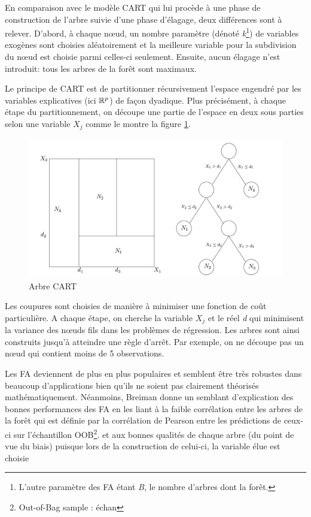 	\par
	 En comparaison avec le modèle CART qui lui procède à une phase de construction de l'arbre suivie d'une phase d'élagage, deux différences sont à relever. D'abord, à chaque nœud, un nombre paramètre (dénoté \textit{k}\footnote{L'autre paramètre des FA étant \textit{B}, le nombre d'arbres dont la forêt.}) de variables exogènes sont choisies aléatoirement et la meilleure variable pour la subdivision du nœud est choisie parmi celles-ci seulement. Ensuite, aucun élagage n'est introduit: tous les arbres de la forêt sont maximaux.\par
	Le principe de CART est de partitionner récursivement l’espace engendré par les variables explicatives (ici $\mathbb{R}^p$) de façon dyadique. Plus précisément, à
	chaque étape du partitionnement, on découpe une partie de l’espace en deux sous parties selon une variable $X_j$ comme le montre la figure \ref{fig:CART}.
	\begin{figure}[h]
	    		\centering
	    		\includegraphics[scale=0.35]{Cart}
	    		\caption{Arbre CART}
	    		\label{fig:CART}
	\end{figure}
	\par
	Les coupures sont choisies de manière à minimiser une fonction de coût particulière. A chaque étape, on cherche la variable $X_j$ et le réel \textit{d} qui minimisent la variance des nœuds fils dans les problèmes de régression. Les arbres sont ainsi construits jusqu’à atteindre une règle d’arrêt. Par exemple, on ne découpe pas un nœud qui contient moins de 5 observations.
	
	
	
	
	
	
	\par
	Les FA deviennent de plus en plus populaires et semblent être très robustes dans beaucoup d'applications bien qu'ils ne soient pas clairement théorisés mathématiquement\cite{BIA08}. Néanmoins, Breiman\cite{BREI01} donne un semblant d'explication des bonnes performances des FA en les liant à la faible corrélation entre les arbres de la forêt qui est définie par la corrélation de Pearson entre les prédictions de ceux-ci sur l'échantillon OOB\footnote{Out-of-Bag sample : échan }. et aux bonnes qualités de chaque arbre (du point de vue du biais) puisque lors de la construction de celui-ci, la variable élue est choisie
	

